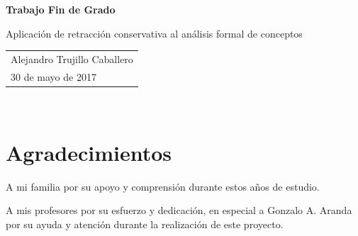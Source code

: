 \begin{center}
	{\bf Trabajo Fin de Grado}
\end{center}



\begin{center}
	{  Aplicación de retracción conservativa al análisis formal de conceptos}
\end{center} 

\Large






\vspace*{4cm}

\vfill


\hspace*{.5\textwidth}
\normalsize
\begin{tabular}{l}
	\LARGE
Alejandro Trujillo Caballero\\
\hspace{3.39cm}	30 de mayo de 2017


\end{tabular} \par

\newpage
\thispagestyle{empty}
\mbox{ }



\newpage
\chapter*{Agradecimientos}
\thispagestyle{empty}

A mi familia por su apoyo y comprensión durante estos años de estudio.

A mis profesores por su esfuerzo y dedicación, en especial a Gonzalo A. Aranda por su ayuda y atención durante la realización de este proyecto.


\newpage
\thispagestyle{empty}
\mbox{ }
\clearpage
